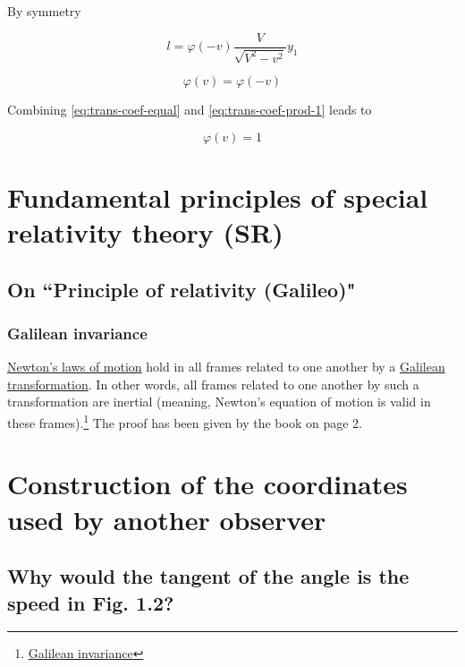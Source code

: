 By symmetry

\begin{equation}
    l = \varphi(-v)\frac{V}{\sqrt{V^2 - v^2}}y_1
\end{equation}

\begin{equation}\label{eq:trans-coef-equal}
    \varphi(v) = \varphi(-v)
\end{equation}

Combining \ref{eq:trans-coef-equal} and \ref{eq:trans-coef-prod-1} leads to

\begin{equation}
    \varphi(v) = 1
\end{equation}


\section{Fundamental principles of special relativity theory (SR)}

\subsection{On ``Principle of relativity (Galileo)"}

\subsubsection{Galilean invariance}

\href{https://en.wikipedia.org/wiki/Newton\%27s_laws_of_motion}{Newton's laws of motion} hold in all frames related
to one another by a \href{https://en.wikipedia.org/wiki/Galilean\_transformation}{Galilean transformation}. In
other words, all frames related to one another by such a transformation are inertial (meaning, Newton's equation of
motion is valid in these frames).\footnote{\href{https://en.wikipedia.org/wiki/Galilean_invariance}{Galilean invariance}}
The proof has been given by the book on page 2.

\section{Construction of the coordinates used by another observer}

\subsection{Why would the tangent of the angle is the speed in Fig. 1.2?}

